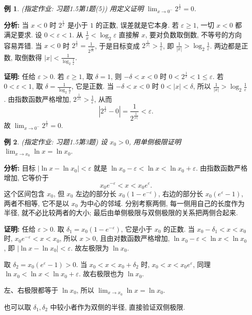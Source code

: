 \documentclass[UTF8,openany]{ctexbook}
\theoremstyle{chinesetextbook}
\newtheorem{example}{例}[section]
\newenvironment{cnproof}{\par\indent\textbf{证明:} \ignorespaces}{\par}
\begin{document}
\begin{example}
\textnormal{(指定作业: 习题1.5第1题(5))} 用定义证明 $\displaystyle\lim_{x\to0^-}2^{\frac1x}=0$.
\end{example}
\par\indent\textbf{分析:} 当 $x<0$ 时 $2^{\frac1x}$ 是小于 $1$ 的正数, 误差就是它本身. 若 $\varepsilon\ge1$, 一切 $x<0$ 都满足要求. 设 $0<\varepsilon<1$. 从 $\displaystyle\frac1x<\log_2\varepsilon$ 直接解 $x$, 要对负数取倒数, 不等号的方向容易弄错. 当 $x<0$ 时 $\displaystyle2^{\frac1x}=\frac1{2^{\frac1{|x|}}}$, 于是目标变成 $\displaystyle2^{\frac1{|x|}}>\frac1\varepsilon$, 即 $\displaystyle\frac1{|x|}>\log_2\frac1\varepsilon$. 两边都是正数, 取倒数得 $\displaystyle|x|<\frac1{\log_2\frac1\varepsilon}$.
\begin{cnproof}
任给 $\varepsilon>0$. 若 $\varepsilon\ge1$, 取 $\delta=1$, 则 $-\delta<x<0$ 时 $0<2^{\frac1x}<1\le\varepsilon$. 若 $0<\varepsilon<1$, 取 $\displaystyle\delta=\frac1{\log_2\frac1\varepsilon}$, 它是正数. 当 $-\delta<x<0$ 时 $0<|x|<\delta$, 所以 $\displaystyle\frac1{|x|}>\log_2\frac1\varepsilon$. 由指数函数严格增加, $\displaystyle2^{\frac1{|x|}}>\frac1\varepsilon$, 从而
\[
\left|2^{\frac1x}-0\right|=\frac1{2^{\frac1{|x|}}}<\varepsilon.
\]
故 $\displaystyle\lim_{x\to0^-}2^{\frac1x}=0$.
\end{cnproof}
\begin{example}
\textnormal{(指定作业: 习题1.5第3题)} 设 $x_0>0$, 用单侧极限证明 $\displaystyle\lim_{x\to x_0}\ln x=\ln x_0$.
\end{example}
\par\indent\textbf{分析:} 目标 $|\ln x-\ln x_0|<\varepsilon$ 就是 $\ln x_0-\varepsilon<\ln x<\ln x_0+\varepsilon$. 由指数函数严格增加, 它等价于
\[
x_0e^{-\varepsilon}<x<x_0e^{\varepsilon}.
\]
这个区间包含 $x_0$, 但 $x_0$ 左边的部分长 $x_0(1-e^{-\varepsilon})$, 右边的部分长 $x_0(e^\varepsilon-1)$, 两者不相等, 它不是以 $x_0$ 为中心的邻域. 分别考察两侧, 每一侧用自己的长度作为半径, 就不必比较两者的大小; 最后由单侧极限与双侧极限的关系把两侧合起来.
\begin{cnproof}
任给 $\varepsilon>0$. 取 $\delta_1=x_0(1-e^{-\varepsilon})$, 它是小于 $x_0$ 的正数. 当 $x_0-\delta_1<x<x_0$ 时, $x_0e^{-\varepsilon}<x<x_0$, 所以 $x>0$, 且由对数函数严格增加, $\ln x_0-\varepsilon<\ln x<\ln x_0$, 即 $|\ln x-\ln x_0|<\varepsilon$. 故左极限为 $\ln x_0$.

取 $\delta_2=x_0(e^{\varepsilon}-1)>0$. 当 $x_0<x<x_0+\delta_2$ 时, $x_0<x<x_0e^{\varepsilon}$, 同理 $\ln x_0<\ln x<\ln x_0+\varepsilon$. 故右极限也为 $\ln x_0$.

左、右极限都等于 $\ln x_0$, 所以 $\displaystyle\lim_{x\to x_0}\ln x=\ln x_0$.
\end{cnproof}
也可以取 $\delta_1,\delta_2$ 中较小者作为双侧的半径, 直接验证双侧极限.
\end{document}
